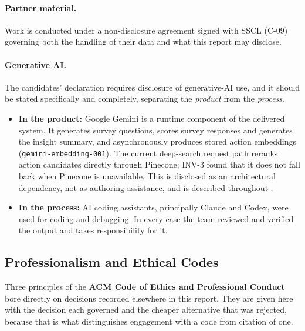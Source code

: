 \paragraph{Partner material.} Work is conducted under a non-disclosure agreement
signed with SSCL (C-09) governing both the handling of their data and what this
report may disclose.

\paragraph{Generative AI.} The candidates' declaration requires disclosure of
generative-AI use, and it should be stated specifically and completely,
separating the \emph{product} from the \emph{process}.

\begin{itemize}
  \item \textbf{In the product:} Google Gemini is a runtime component of the
  delivered system. It generates survey questions, scores survey responses and
  generates the insight summary, and asynchronously produces stored action
  embeddings (\texttt{gemini-embedding-001}). The current deep-search request
  path reranks action candidates directly through Pinecone; INV-3 found that it
  does not fall back when Pinecone is unavailable. This is disclosed as an
  architectural dependency, not as authoring assistance, and is described
  throughout .
  \item \textbf{In the process:} AI coding assistants, principally Claude and
  Codex, were used for coding and debugging. In every case the team reviewed and
  verified the output and takes responsibility for it.
\end{itemize}

\subsection{Professionalism and Ethical Codes}
\label{subsec:codes}

Three principles of the \textbf{ACM Code of Ethics and Professional Conduct}
bore directly on decisions recorded elsewhere in this report. They are given
here with the decision each governed and the cheaper alternative that was
rejected, because that is what distinguishes engagement with a code from
citation of one.

